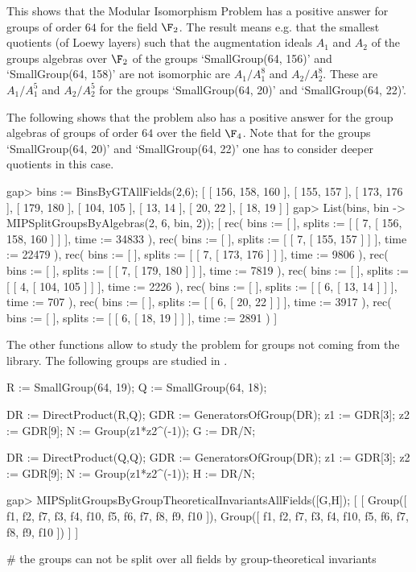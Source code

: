 This shows that the Modular Isomorphism Problem has a positive answer for groups
of order $64$ for the field $\F_2$. The result means e.g. that the smallest quotients
(of Loewy layers)
such that the augmentation ideals $A_1$ and $A_2$ of the groups algebras over $\F_2$ of the
groups `SmallGroup(64, 156)' and `SmallGroup(64, 158)' are not isomorphic are $A_1/A_1^8$
and $A_2/A_2^8$. These are $A_1/A_1^5$ and $A_2/A_2^5$ for the groups
`SmallGroup(64, 20)' and `SmallGroup(64, 22)'. 

The following shows that the problem also has a positive answer for the group
algebras of groups of order $64$ over the field $\F_4$. Note that for the groups
`SmallGroup(64, 20)' and `SmallGroup(64, 22)' one has to consider deeper quotients
in this case.

\beginexample
gap> bins := BinsByGTAllFields(2,6);
[ [ 156, 158, 160 ], [ 155, 157 ], [ 173, 176 ], [ 179, 180 ], [ 104, 105 ], 
  [ 13, 14 ], [ 20, 22 ], [ 18, 19 ] ]
gap> List(bins, bin -> MIPSplitGroupsByAlgebras(2, 6, bin, 2));
[ rec( bins := [  ], splits := [ [ 7, [ 156, 158, 160 ] ] ], time := 34833 ), 
  rec( bins := [  ], splits := [ [ 7, [ 155, 157 ] ] ], time := 22479 ), 
  rec( bins := [  ], splits := [ [ 7, [ 173, 176 ] ] ], time := 9806 ), 
  rec( bins := [  ], splits := [ [ 7, [ 179, 180 ] ] ], time := 7819 ), 
  rec( bins := [  ], splits := [ [ 4, [ 104, 105 ] ] ], time := 2226 ), 
  rec( bins := [  ], splits := [ [ 6, [ 13, 14 ] ] ], time := 707 ), 
  rec( bins := [  ], splits := [ [ 6, [ 20, 22 ] ] ], time := 3917 ), 
  rec( bins := [  ], splits := [ [ 6, [ 18, 19 ] ] ], time := 2891 ) ]

\endexample

The other functions allow to study the problem for groups not coming from the
library. The following groups are studied in \cite{GLM24}.

\beginexample
R := SmallGroup(64, 19);
Q := SmallGroup(64, 18);

DR := DirectProduct(R,Q);
GDR := GeneratorsOfGroup(DR);
z1 := GDR[3];
z2 := GDR[9];
N := Group(z1*z2^(-1));
G := DR/N;

DR := DirectProduct(Q,Q);
GDR := GeneratorsOfGroup(DR);
z1 := GDR[3];
z2 := GDR[9];
N := Group(z1*z2^(-1));
H := DR/N;

gap> MIPSplitGroupsByGroupTheoreticalInvariantsAllFields([G,H]);
[ [ Group([ f1, f2, f7, f3, f4, f10, f5, f6, f7, f8, f9, f10 ]), 
      Group([ f1, f2, f7, f3, f4, f10, f5, f6, f7, f8, f9, f10 ]) ] ]

# the groups can not be split over all fields by group-theoretical invariants

